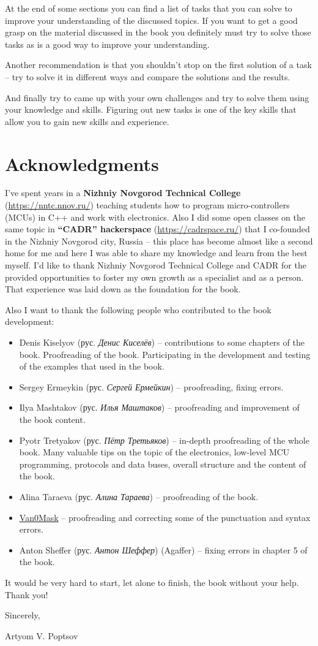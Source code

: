 \documentclass[../sparc.tex]{subfiles}
\begin{document}
At the end of some sections you can find a list of tasks that you can solve to
improve your understanding of the discussed topics.  If you want to get a good
grasp on the material discussed in the book you definitely must try to solve
those tasks as is a good way to improve your understanding.

Another recommendation is that you shouldn't stop on the first solution of a
task -- try to solve it in different ways and compare the solutions and the
results.

And finally try to came up with your own challenges and try to solve them using
your knowledge and skills.  Figuring out new tasks is one of the key skills that
allow you to gain new skills and experience.

\section*{Acknowledgments}

I've spent years in a \textbf{Nizhniy Novgorod Technical College}
(\url{https://nntc.nnov.ru/}) teaching students how to program micro-controllers
(MCUs) in C++ and work with electronics.  Also I did some open classes on the
same topic in \textbf{``CADR'' hackerspace} (\url{https://cadrspace.ru/}) that I
co-founded in the Nizhniy Novgorod city, Russia -- this place has become almost
like a second home for me and here I was able to share my knowledge and learn
from the best myself.  I'd like to thank Nizhniy Novgorod Technical College and
CADR for the provided opportunities to foster my own growth as a specialist and
as a person.  That experience was laid down as the foundation for the book.

Also I want to thank the following people who contributed to the book
development:
\begin{itemize}
\item Denis Kiselyov (рус. \emph{Денис Киселёв}) -- contributions to some
  chapters of the book.  Proofreading of the book.  Participating in the
  development and testing of the examples that used in the book.
\item Sergey Ermeykin (рус. \emph{Сергей Ермейкин}) -- proofreading, fixing
  errors.
\item Ilya Mashtakov (рус. \emph{Илья Маштаков}) – proofreading and improvement
  of the book content.
\item Pyotr Tretyakov (рус. \emph{Пётр Третьяков}) -- in-depth proofreading of
  the whole book.  Many valuable tips on the topic of the electronics, low-level
  MCU programming, protocols and data buses, overall structure and the content
  of the book.
\item Alina Taraeva (рус. \emph{Алина Тараева}) -- proofreading of the book.
\item \href{https://github.com/V4n0M4sk}{Van0Mask} -- proofreading and correcting some of the punctuation and syntax errors.
\item Anton Sheffer (рус. \emph{Антон Шеффер}) (Agaffer) -- fixing errors in
  chapter 5 of the book.
\end{itemize}

It would be very hard to start, let alone to finish, the book without your help.
Thank you!
\vspace{5mm}

\hspace{1cm}Sincerely,

\hspace{1cm}Artyom V. Poptsov
\end{document}
